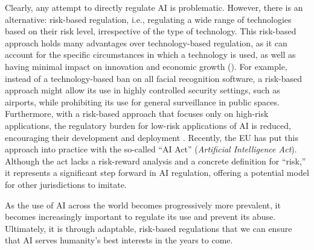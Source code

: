\documentclass[12pt, a4paper, twoside]{article}
\begin{document}
Clearly, any attempt to directly regulate AI is problematic. However, there is an alternative: risk-based regulation, i.e., regulating a wide range of technologies based on their risk level, irrespective of the type of technology. This risk-based approach holds many advantages over technology-based regulation, as it can account for the specific circumstances in which a technology is used, as well as having minimal impact on innovation and economic growth (\cites{MarcinekEtAl2024RANDAIActPrimer}{Bradford2023RaceToRegulateAI}). For example, instead of a technology-based ban on all facial recognition software, a risk-based approach might allow its use in highly controlled security settings, such as airports, while prohibiting its use for general surveillance in public spaces. Furthermore, with a risk-based approach that focuses only on high-risk applications, the regulatory burden for low-risk applications of AI is reduced, encouraging their development and deployment \autocite[p..\ 4--6]{Ebers2024RiskBasedEUAIACT}. Recently, the EU has put this approach into practice with the so-called “AI Act” (\emph{Artificial Intelligence Act}). Although the act lacks a risk-reward analysis and a concrete definition for “risk,” it represents a significant step forward in AI regulation, offering a potential model for other jurisdictions to imitate.

As the use of AI across the world becomes progressively more prevalent, it becomes increasingly important to regulate its use and prevent its abuse. Ultimately, it is through adaptable, risk-based regulations that we can ensure that AI serves humanity's best interests in the years to come.

\printbibliography
\end{document}

